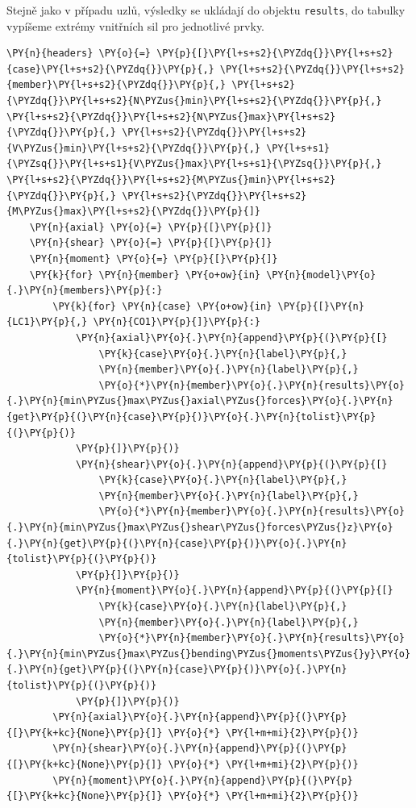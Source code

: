     Stejně jako v případu uzlů, výsledky se ukládají do objektu \texttt{results}, do tabulky vypíšeme extrémy vnitřních sil pro jednotlivé prvky.
        \begin{tcolorbox}[breakable, size=fbox, boxrule=1pt, pad at break*=1mm,colback=cellbackground, colframe=cellborder]
    \begin{Verbatim}[commandchars=\\\{\}]
    \PY{n}{headers} \PY{o}{=} \PY{p}{[}\PY{l+s+s2}{\PYZdq{}}\PY{l+s+s2}{case}\PY{l+s+s2}{\PYZdq{}}\PY{p}{,} \PY{l+s+s2}{\PYZdq{}}\PY{l+s+s2}{member}\PY{l+s+s2}{\PYZdq{}}\PY{p}{,} \PY{l+s+s2}{\PYZdq{}}\PY{l+s+s2}{N\PYZus{}min}\PY{l+s+s2}{\PYZdq{}}\PY{p}{,} \PY{l+s+s2}{\PYZdq{}}\PY{l+s+s2}{N\PYZus{}max}\PY{l+s+s2}{\PYZdq{}}\PY{p}{,} \PY{l+s+s2}{\PYZdq{}}\PY{l+s+s2}{V\PYZus{}min}\PY{l+s+s2}{\PYZdq{}}\PY{p}{,} \PY{l+s+s1}{\PYZsq{}}\PY{l+s+s1}{V\PYZus{}max}\PY{l+s+s1}{\PYZsq{}}\PY{p}{,} \PY{l+s+s2}{\PYZdq{}}\PY{l+s+s2}{M\PYZus{}min}\PY{l+s+s2}{\PYZdq{}}\PY{p}{,} \PY{l+s+s2}{\PYZdq{}}\PY{l+s+s2}{M\PYZus{}max}\PY{l+s+s2}{\PYZdq{}}\PY{p}{]}
    \PY{n}{axial} \PY{o}{=} \PY{p}{[}\PY{p}{]}
    \PY{n}{shear} \PY{o}{=} \PY{p}{[}\PY{p}{]}
    \PY{n}{moment} \PY{o}{=} \PY{p}{[}\PY{p}{]}
    \PY{k}{for} \PY{n}{member} \PY{o+ow}{in} \PY{n}{model}\PY{o}{.}\PY{n}{members}\PY{p}{:}
        \PY{k}{for} \PY{n}{case} \PY{o+ow}{in} \PY{p}{[}\PY{n}{LC1}\PY{p}{,} \PY{n}{CO1}\PY{p}{]}\PY{p}{:}
            \PY{n}{axial}\PY{o}{.}\PY{n}{append}\PY{p}{(}\PY{p}{[}
                \PY{k}{case}\PY{o}{.}\PY{n}{label}\PY{p}{,}
                \PY{n}{member}\PY{o}{.}\PY{n}{label}\PY{p}{,}
                \PY{o}{*}\PY{n}{member}\PY{o}{.}\PY{n}{results}\PY{o}{.}\PY{n}{min\PYZus{}max\PYZus{}axial\PYZus{}forces}\PY{o}{.}\PY{n}{get}\PY{p}{(}\PY{n}{case}\PY{p}{)}\PY{o}{.}\PY{n}{tolist}\PY{p}{(}\PY{p}{)}
            \PY{p}{]}\PY{p}{)}
            \PY{n}{shear}\PY{o}{.}\PY{n}{append}\PY{p}{(}\PY{p}{[}
                \PY{k}{case}\PY{o}{.}\PY{n}{label}\PY{p}{,}
                \PY{n}{member}\PY{o}{.}\PY{n}{label}\PY{p}{,}
                \PY{o}{*}\PY{n}{member}\PY{o}{.}\PY{n}{results}\PY{o}{.}\PY{n}{min\PYZus{}max\PYZus{}shear\PYZus{}forces\PYZus{}z}\PY{o}{.}\PY{n}{get}\PY{p}{(}\PY{n}{case}\PY{p}{)}\PY{o}{.}\PY{n}{tolist}\PY{p}{(}\PY{p}{)}
            \PY{p}{]}\PY{p}{)}
            \PY{n}{moment}\PY{o}{.}\PY{n}{append}\PY{p}{(}\PY{p}{[}
                \PY{k}{case}\PY{o}{.}\PY{n}{label}\PY{p}{,}
                \PY{n}{member}\PY{o}{.}\PY{n}{label}\PY{p}{,}
                \PY{o}{*}\PY{n}{member}\PY{o}{.}\PY{n}{results}\PY{o}{.}\PY{n}{min\PYZus{}max\PYZus{}bending\PYZus{}moments\PYZus{}y}\PY{o}{.}\PY{n}{get}\PY{p}{(}\PY{n}{case}\PY{p}{)}\PY{o}{.}\PY{n}{tolist}\PY{p}{(}\PY{p}{)}
            \PY{p}{]}\PY{p}{)}
        \PY{n}{axial}\PY{o}{.}\PY{n}{append}\PY{p}{(}\PY{p}{[}\PY{k+kc}{None}\PY{p}{]} \PY{o}{*} \PY{l+m+mi}{2}\PY{p}{)}
        \PY{n}{shear}\PY{o}{.}\PY{n}{append}\PY{p}{(}\PY{p}{[}\PY{k+kc}{None}\PY{p}{]} \PY{o}{*} \PY{l+m+mi}{2}\PY{p}{)}
        \PY{n}{moment}\PY{o}{.}\PY{n}{append}\PY{p}{(}\PY{p}{[}\PY{k+kc}{None}\PY{p}{]} \PY{o}{*} \PY{l+m+mi}{2}\PY{p}{)}
    

\end{Verbatim}
\end{tcolorbox}
